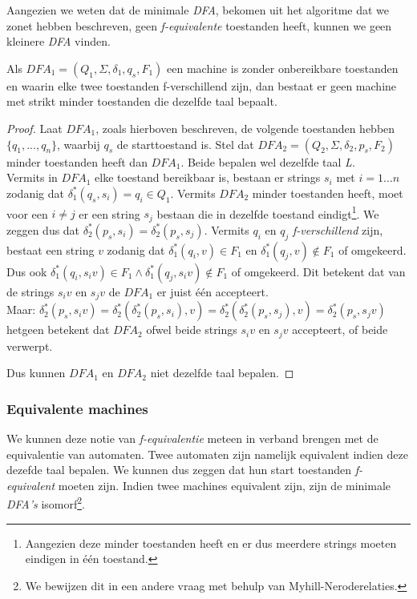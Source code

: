 Aangezien we weten dat de minimale \emph{DFA}, bekomen uit het algoritme dat we zonet hebben beschreven, geen \emph{f-equivalente} toestanden heeft, kunnen we geen kleinere \emph{DFA} vinden.

\begin{theorem}
	Als $DFA_1 = (Q_1,\Sigma,\delta_1,q_s,F_1)$ een machine is zonder onbereikbare toestanden en waarin elke twee toestanden f-verschillend zijn, dan bestaat er geen machine met strikt minder toestanden die dezelfde taal bepaalt.
\end{theorem}

\begin{proof}
	Laat $DFA_1$, zoals hierboven beschreven, de volgende toestanden hebben $\{q_1,...,q_n\}$, waarbij $q_s$ de starttoestand is. Stel dat $DFA_2 = (Q_2,\Sigma,\delta_2,p_s,F_2)$ minder toestanden heeft dan $DFA_1$. Beide bepalen wel dezelfde taal \emph{L}.\\

	Vermits in $DFA_1$ elke toestand bereikbaar is, bestaan er strings $s_i$ met $i=1 \dots n$ zodanig dat $\delta_1^*(q_s,s_i)=q_i \in Q_1$. Vermits $DFA_2$ minder toestanden heeft, moet voor een $i \neq j$ er een string $s_j$ bestaan die in dezelfde toestand eindigt\footnote{Aangezien deze minder toestanden heeft en er dus meerdere strings moeten eindigen in \'e\'en toestand.}. We zeggen dus dat $\delta^*_2(p_s,s_i)=\delta^*_2(p_s,s_j)$. Vermits $q_i$ en $q_j$ \textit{f-verschillend} zijn, bestaat een string $v$ zodanig dat $\delta_1^*(q_i, v)\in F_1$ en $\delta^*_1(q_j,v) \notin F_1$ of omgekeerd.\\

	Dus ook $\delta_1^*(q_i, s_i v)\in F_1 \wedge \delta^*_1(q_j,s_i v) \notin F_1$ of omgekeerd. Dit betekent dat van de strings $s_i v$ en $s_j v$ de $DFA_1$ er juist \'e\'en accepteert.\\

	Maar: $\delta_2^*(p_s,s_i v) = \delta_2^*(\delta_2^*(p_s,s_i),v) = \delta_2^*(\delta_2^*(p_s,s_j),v) = \delta_2^*(p_s,s_j v)$ hetgeen betekent dat $DFA_2$ ofwel beide strings $s_iv$ en $s_jv$ accepteert, of beide verwerpt.

	Dus kunnen $DFA_1$ en $DFA_2$ niet dezelfde taal bepalen.
\end{proof}

\subsubsection*{Equivalente machines}

We kunnen deze notie van \textit{f-equivalentie} meteen in verband brengen met de equivalentie van automaten. Twee automaten zijn namelijk equivalent indien deze dezefde taal bepalen. We kunnen dus zeggen dat hun start toestanden \textit{f-equivalent} moeten zijn. Indien twee machines equivalent zijn, zijn de minimale \emph{DFA's} isomorf\footnote{We bewijzen dit in een andere vraag met behulp van Myhill-Neroderelaties.}.

